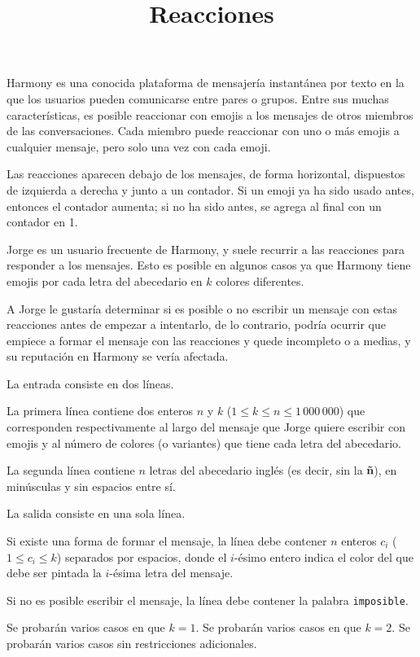 \documentclass{oci}
\title{Reacciones}
\newcommand{\platform}{Harmony}
\newcommand{\hero}{Jorge}
\begin{document}
\begin{problemDescription}
\platform{} es una conocida plataforma de mensajería instantánea por texto en la que los usuarios pueden comunicarse entre pares o grupos.
Entre sus muchas características, es posible reaccionar con emojis a los mensajes de otros miembros de las conversaciones.
Cada miembro puede reaccionar con uno o más emojis a cualquier mensaje, pero solo una vez con cada emoji.

Las reacciones aparecen debajo de los mensajes, de forma horizontal, dispuestos de izquierda a derecha y junto a un contador.
Si un emoji ya ha sido usado antes, entonces el contador aumenta; si no ha sido antes, se agrega al final con un contador en 1.

\hero{} es un usuario frecuente de \platform{}, y suele recurrir a las reacciones para responder a los mensajes.
Esto es posible en algunos casos ya que \platform{} tiene emojis por cada letra del abecedario en $k$ colores diferentes.

A \hero{} le gustaría determinar si es posible o no escribir un mensaje con estas reacciones antes de empezar a intentarlo, de lo contrario, podría ocurrir que empiece a formar el mensaje con las reacciones y quede incompleto o a medias, y su reputación en \platform{} se vería afectada.

\end{problemDescription}

\begin{inputDescription}
La entrada consiste en dos líneas.

La primera línea contiene dos enteros $n$ y $k$ ($1 \le k \le n \le 1\,000\,000$) que corresponden respectivamente al largo del mensaje que \hero{} quiere escribir con emojis y al número de colores (o variantes) que tiene cada letra del abecedario.

La segunda línea contiene $n$ letras del abecedario inglés (es decir, sin la \textbf{ñ}), en minúsculas y sin espacios entre sí.
\end{inputDescription}

\begin{outputDescription}
La salida consiste en una sola línea.

Si existe una forma de formar el mensaje, la línea debe contener $n$ enteros $c_i$ ($1 \le c_i \le k$) separados por espacios, donde el $i$-ésimo entero indica el color del que debe ser pintada la $i$-ésima letra del mensaje.

Si no es posible escribir el mensaje, la línea debe contener la palabra \texttt{imposible}.
\end{outputDescription}

\begin{scoreDescription}
  Se probarán varios casos en que $k = 1$.
  Se probarán varios casos en que $k = 2$.
  Se probarán varios casos sin restricciones adicionales.
\end{scoreDescription}

\begin{sampleDescription}
\end{sampleDescription}
\end{document}
